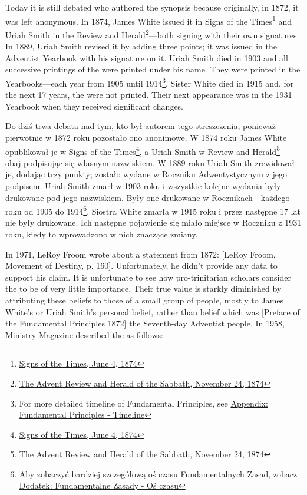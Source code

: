Today it is still debated who authored the synopsis because originally, in 1872, it was left anonymous. In 1874, James White issued it in Signs of the Times\footnote{\href{https://adventistdigitallibrary.org/adl-364148/signs-times-june-4-1874}{Signs of the Times, June 4, 1874}} and Uriah Smith in the Review and Herald\footnote{\href{http://documents.adventistarchives.org/Periodicals/RH/RH18741124-V44-22.pdf}{The Advent Review and Herald of the Sabbath, November 24, 1874}}—both signing with their own signatures. In 1889, Uriah Smith revised it by adding three points; it was issued in the Adventist Yearbook with his signature on it. Uriah Smith died in 1903 and all successive printings of the  were printed under his name. They were printed in the Yearbooks—each year from 1905 until 1914\footnote{For more detailed timeline of Fundamental Principles, see \hyperref[appendix:timeline]{Appendix: Fundamental Principles - Timeline}}. Sister White died in 1915 and, for the next 17 years, the  were not printed. Their next appearance was in the 1931 Yearbook when they received significant changes.


Do dziś trwa debata nad tym, kto był autorem tego streszczenia, ponieważ pierwotnie w 1872 roku pozostało ono anonimowe. W 1874 roku James White opublikował je w Signs of the Times\footnote{\href{https://adventistdigitallibrary.org/adl-364148/signs-times-june-4-1874}{Signs of the Times, June 4, 1874}}, a Uriah Smith w Review and Herald\footnote{\href{http://documents.adventistarchives.org/Periodicals/RH/RH18741124-V44-22.pdf}{The Advent Review and Herald of the Sabbath, November 24, 1874}}—obaj podpisując się własnym nazwiskiem. W 1889 roku Uriah Smith zrewidował je, dodając trzy punkty; zostało wydane w Roczniku Adwentystycznym z jego podpisem. Uriah Smith zmarł w 1903 roku i wszystkie kolejne wydania  były drukowane pod jego nazwiskiem. Były one drukowane w Rocznikach—każdego roku od 1905 do 1914\footnote{Aby zobaczyć bardziej szczegółową oś czasu Fundamentalnych Zasad, zobacz \hyperref[appendix:timeline]{Dodatek: Fundamentalne Zasady - Oś czasu}}. Siostra White zmarła w 1915 roku i przez następne 17 lat  nie były drukowane. Ich następne pojawienie się miało miejsce w Roczniku z 1931 roku, kiedy to wprowadzono w nich znaczące zmiany.


In 1971, LeRoy Froom wrote about a statement from 1872: [LeRoy Froom, Movement of Destiny, p. 160]. Unfortunately, he didn’t provide any data to support his claim. It is unfortunate to see how pro-trinitarian scholars consider the  to be of very little importance. Their true value is starkly diminished by attributing these beliefs to those of a small group of people, mostly to James White’s or Uriah Smith’s personal belief, rather than belief which was [Preface of the Fundamental Principles 1872] the Seventh-day Adventist people. In 1958, Ministry Magazine described the  as follows:



